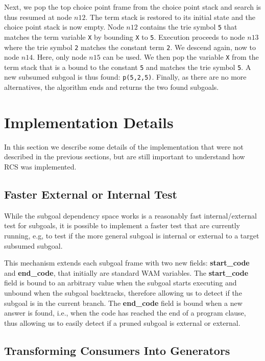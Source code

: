 Next, we pop the top choice point frame from the choice point stack and search is thus resumed
at node $n12$. The term stack is restored to its initial state and the choice point stack is
now empty. Node $n12$ contains the trie symbol \texttt{5} that matches the term variable \texttt{X}
by bounding \texttt{X} to \texttt{5}. Execution proceeds to node $n13$ where the trie symbol
\texttt{2} matches the constant term \texttt{2}. We descend again, now to node $n14$. Here,
only node $n15$ can be used. We then pop the variable \texttt{X} from the term stack that is a
bound to the constant \texttt{5} and matches the trie symbol \texttt{5}. A new
subsumed subgoal is thus found: \texttt{p(5,2,5)}. Finally, as there are no more alternatives,
the algorithm ends and returns the two found subgoals. 

\section{Implementation Details}

In this section we describe some details of the implementation that were not described
in the previous sections, but are still important to understand how RCS was implemented.

\subsection{Faster External or Internal Test}

While the subgoal dependency space works is a reasonably fast internal/external test
for subgoals, it is possible to implement a faster test that are currently running, e.g,
to test if the more general subgoal is internal or external to a target subsumed subgoal.

This mechanism extends each subgoal frame with two new fields: \textbf{start\_code}
and \textbf{end\_code}, that initially are standard WAM variables.
The \textbf{start\_code} field is bound to an arbitrary value when the subgoal starts
executing and unbound when the subgoal backtracks, therefore allowing us to detect
if the subgoal is in the current branch. The \textbf{end\_code} field is bound
when a new answer is found, i.e., when the code has reached the end of a program
clause, thus allowing us to easily detect if a pruned subgoal is external or external.

\subsection{Transforming Consumers Into Generators}

